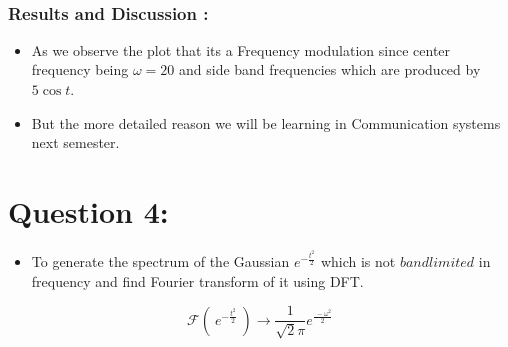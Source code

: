 \documentclass[8pt]{article}
\providecommand{\tightlist}{%
      \setlength{\itemsep}{0pt}\setlength{\parskip}{0pt}}
\begin{document}
    \begin{center}
    \end{center}
    { \hspace*{\fill} \\}
    
    \subsubsection{Results and Discussion :}\label{results-and-discussion}

\begin{itemize}
\tightlist
\item
  As we observe the plot that its a Frequency modulation since center
  frequency being \(\omega = 20\) and side band frequencies which are
  produced by \(5\cos t\).
\item
  But the more detailed reason we will be learning in Communication
  systems next semester.
\end{itemize}

    \section{Question 4:}\label{question-4}

\begin{itemize}
\tightlist
\item
  To generate the spectrum of the Gaussian \(e^{-\frac{t^{2}}{ 2}}\)
  which is not \(bandlimited\) in frequency and find Fourier transform
  of it using DFT.
\end{itemize}

\begin{equation}
 \mathcal{F} ( \ e^{-\frac{t^{2}}{2}} \ ) \to \frac{1}{\sqrt 2\pi} e^{\frac{\ - \omega ^{2}}{2}}
\end{equation}
\end{document}
